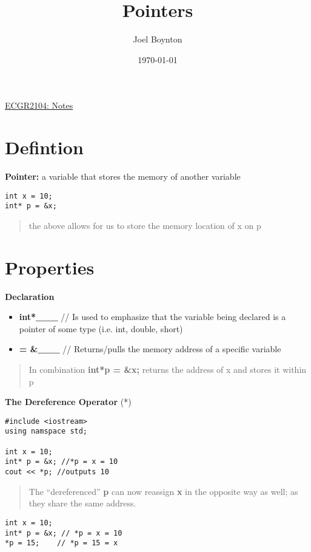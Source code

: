 \documentclass[11pt]{article}
\author{Joel Boynton}
\date{\today}
\title{Pointers}
\begin{document}
\maketitle
\href{ecgr2104.org}{ECGR2104: Notes}
\section{Defintion}
\label{sec:org3802979}
\textbf{Pointer:} a variable that stores the memory of another variable
\begin{verbatim}
int x = 10;
int* p = &x;
\end{verbatim}
\begin{quote}
the above allows for us to store the memory location of x on p
\end{quote}
\section{Properties}
\label{sec:org6276eb3}
\textbf{Declaration}

\begin{itemize}
\item \textbf{int*\_\_\_}     // Is used to emphasize that the variable being declared is a pointer of some type (i.e. int, double, short)

\item \textbf{= \&\_\_\_}   // Returns/pulls the memory address of a specific variable
\end{itemize}

\begin{quote}
In combination \textbf{int*p = \&x;} returns the address of x and stores it within p
\end{quote}
\textbf{The Dereference Operator} (*)
\begin{verbatim}
#include <iostream>
using namspace std;

int x = 10;
int* p = &x; //*p = x = 10
cout << *p; //outputs 10
\end{verbatim}
\begin{quote}
The ``dereferenced'' \textbf{p} can now reassign \textbf{x} in the opposite way as well; as they share the same address.
\end{quote}
\begin{verbatim}
int x = 10;
int* p = &x; // *p = x = 10
*p = 15;    // *p = 15 = x
\end{verbatim}
\end{document}
